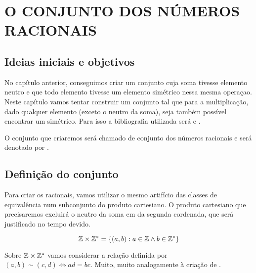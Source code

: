 \documentclass[../main.tex]{subfiles}
\begin{document}
\chapter{O CONJUNTO DOS NÚMEROS RACIONAIS}
\section{Ideias iniciais e objetivos}

No capítulo anterior, conseguimos criar um conjunto \Z cuja soma tivesse elemento neutro e que todo elemento tivesse um elemento simétrico nessa mesma operaçao. Neste capítulo vamos tentar construir um conjunto tal que para a multiplicação, dado qualquer elemento (exceto o neutro da soma), seja também possível encontrar um simétrico. Para isso a bibliografia utilizada será \parencite{domingues-2009} e \parencite{ferreira}.

O conjunto que criaremos será chamado de conjunto dos números racionais e será denotado por \Q.

\section{Definição do conjunto}
Para criar os racionais, vamos utilizar o mesmo artifício das classes de equivalência num subconjunto do produto cartesiano. O produto cartesiano que precisaremos excluirá o neutro da soma em \Z da segunda cordenada, que será justificado no tempo devido.

$$\mathbb{Z} \times \mathbb{Z}^* = \{ \left( a,b \right) : a \in \mathbb{Z} \land b \in \mathbb{Z}^* \}$$

Sobre $\mathbb{Z} \times \mathbb{Z}^*$ vamos considerar a relação definida por $\left( a,b \right) \sim \left( c,d \right) \iff ad = bc$. Muito, muito analogamente à criação de \Z.
\end{document}
